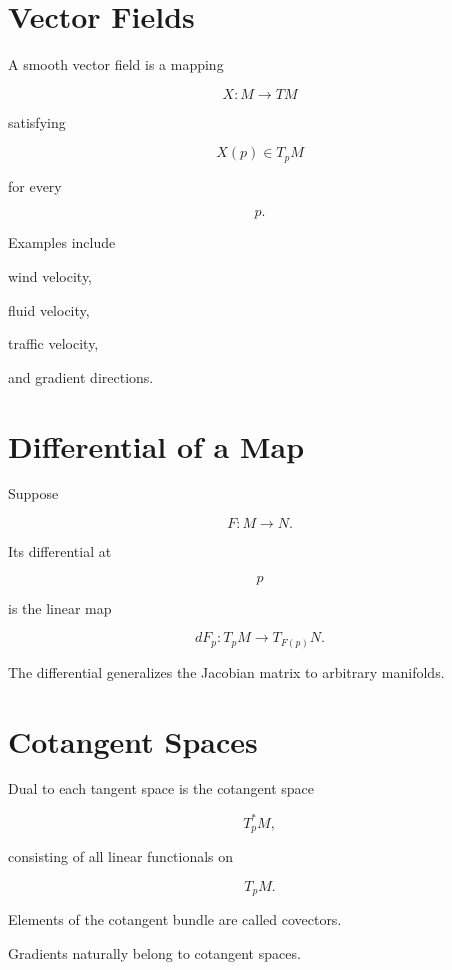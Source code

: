 \documentclass[11pt,fleqn]{book}
\numberwithin{equation}{chapter}
\theoremstyle{plain}
\theoremstyle{definition}
\theoremstyle{remark}
\begin{document}
\section{Vector Fields}

A smooth vector field is a mapping

\[
X:M\rightarrow TM
\]

satisfying

\[
X(p)\in T_pM
\]

for every

\[
p.
\]

Examples include

wind velocity,

fluid velocity,

traffic velocity,

and gradient directions.


\section{Differential of a Map}

Suppose

\[
F:M\rightarrow N.
\]

Its differential at

\[
p
\]

is the linear map

\[
\boxed{
dF_p
:
T_pM
\rightarrow
T_{F(p)}N.
}
\]

The differential generalizes the Jacobian matrix to arbitrary
manifolds.


\section{Cotangent Spaces}

Dual to each tangent space is the cotangent space

\[
T_p^*M,
\]

consisting of all linear functionals on

\[
T_pM.
\]

Elements of the cotangent bundle are called covectors.

Gradients naturally belong to cotangent spaces.

\end{document}
